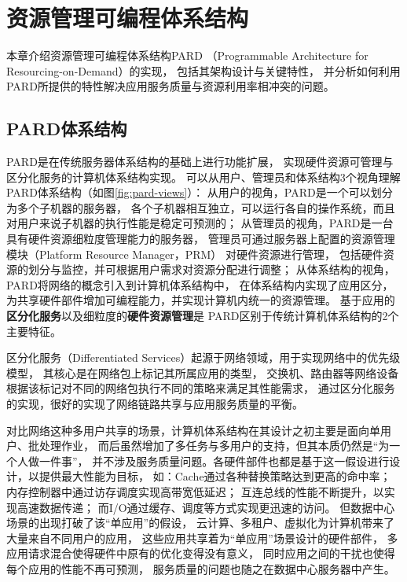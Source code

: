 

\chapter{资源管理可编程体系结构}
\label{chap:pardarch}

本章介绍资源管理可编程体系结构PARD
（Programmable Architecture for Resourcing-on-Demand）\cite{pard:2015}的实现，
包括其架构设计与关键特性，
并分析如何利用PARD所提供的特性解决应用服务质量与资源利用率相冲突的问题。


\section{PARD体系结构}

PARD是在传统服务器体系结构的基础上进行功能扩展，
实现硬件资源可管理与区分化服务的计算机体系结构实现。
可以从用户、管理员和体系结构3个视角理解PARD体系结构（如图\ref{fig:pard-views}）：
从用户的视角，PARD是一个可以划分为多个子机器的服务器，
各个子机器相互独立，可以运行各自的操作系统，而且对用户来说子机器的执行性能是稳定可预测的；
从管理员的视角，PARD是一台具有硬件资源细粒度管理能力的服务器，
管理员可通过服务器上配置的资源管理模块（Platform Resource Manager，PRM）
对硬件资源进行管理，
包括硬件资源的划分与监控，并可根据用户需求对资源分配进行调整；
从体系结构的视角，PARD将网络的概念引入到计算机体系结构中，
在体系结构内实现了应用区分，为共享硬件部件增加可编程能力，并实现计算机内统一的资源管理。
基于应用的\textbf{区分化服务}以及细粒度的\textbf{硬件资源管理}是
PARD区别于传统计算机体系结构的2个主要特征。

区分化服务（Differentiated Services）起源于网络领域，用于实现网络中的优先级模型，
其核心是在网络包上标记其所属应用的类型，
交换机、路由器等网络设备根据该标记对不同的网络包执行不同的策略来满足其性能需求，
通过区分化服务的实现，很好的实现了网络链路共享与应用服务质量的平衡。

对比网络这种多用户共享的场景，计算机体系结构在其设计之初主要是面向单用户、批处理作业，
而后虽然增加了多任务与多用户的支持，但其本质仍然是``为一个人做一件事''，
并不涉及服务质量问题。各硬件部件也都是基于这一假设进行设计，以提供最大性能为目标，
如：Cache通过各种替换策略达到更高的命中率；
内存控制器中通过访存调度实现高带宽低延迟；
互连总线的性能不断提升，以实现高速数据传递；
而I/O通过缓存、调度等方式实现更迅速的访问。
但数据中心场景的出现打破了该``单应用''的假设，
云计算、多租户、虚拟化为计算机带来了大量来自不同用户的应用，
这些应用共享着为``单应用''场景设计的硬件部件，
多应用请求混合使得硬件中原有的优化变得没有意义，
同时应用之间的干扰也使得每个应用的性能不再可预测，
服务质量的问题也随之在数据中心服务器中产生。

